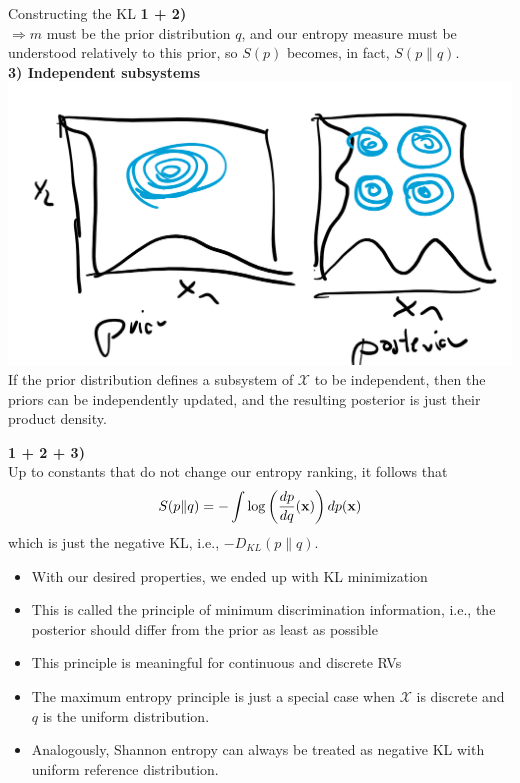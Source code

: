 \documentclass[11pt,compress,t,notes=noshow, xcolor=table]{beamer}
\begin{document}
\begin{vbframe}{Constructing the KL}
    \textbf{1 + 2)} 
    \\ $\Rightarrow m$ must be the prior distribution $q$, and our entropy measure must be understood relatively to this prior, so $S(p)$ becomes, in fact, $S(p\|q).$\\
    \lz 
    \textbf{3) Independent subsystems} \\
    \includegraphics[width=0.6\linewidth]{figure_man/kl_me_indep_sub.png} \\
    If the prior distribution defines a subsystem of $\mathcal{X}$ to be independent, then the priors can be independently updated, and the resulting posterior is just their product density.
    
    \framebreak

    \textbf{1 + 2 + 3)} \\
    Up to constants that do not change our entropy ranking, it follows that 
    $$S(p\|q) = - \int \log\left(\frac{dp}{dq}(\mathbf{x})\right)dp(\mathbf{x})$$
    which is just the negative KL, i.e., $-D_{KL}(p\|q).$

    \begin{itemize}
        \item With our desired properties, we ended up with KL minimization
        \item This is called the principle of minimum discrimination information, i.e., the posterior should differ from the prior as least as possible
        \item This principle is meaningful for continuous and discrete RVs
        \item The maximum entropy principle is just a special case when $\mathcal{X}$ is discrete and $q$ is the uniform distribution.
        \item Analogously, Shannon entropy can always be treated as negative KL  with uniform reference distribution.
    \end{itemize}
    
\end{vbframe}
\endlecture
\end{document}
